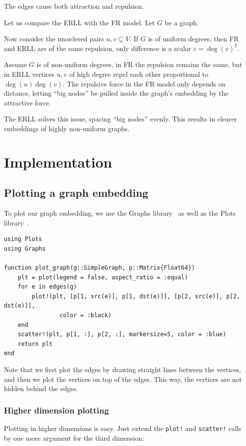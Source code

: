 \documentclass[12pt]{article}
\begin{document}
The edges cause both attraction and repulsion.

Let us compare the ERLL with the FR model. Let $G$ be a graph.

Now consider the unordered pairs ${u,v} \subseteq V$.
If $G$ is of uniform degrees, then FR and ERLL are of the same repulsion, only difference is a scalar $c=\deg{(v)}^2$.

Assume $G$ is of non-uniform degrees, in FR the repulsion remains the same, but in ERLL vertices $u,v$ of high degree repel each other proportional to $\deg(u)\deg(v)$.
The repulsive force in the FR model only depends on distance, letting ``big nodes'' be pulled inside the graph's embedding by the attractive force.

The ERLL solves this issue, spacing ``big nodes'' evenly. This results in clearer embeddings of highly non-uniform graphs. 

\section{Implementation}

\subsection{Plotting a graph embedding}

To plot our graph embedding, we use the Graphs library~\cite{graphsjl} as well as the Plots library~\cite{plotsjl}.

\begin{verbatim}
using Plots
using Graphs

function plot_graph(g::SimpleGraph, p::Matrix{Float64})
    plt = plot(legend = false, aspect_ratio = :equal)
    for e in edges(g)
        plot!(plt, [p[1, src(e)], p[1, dst(e)]], [p[2, src(e)], p[2, dst(e)]],
                color = :black)
    end
    scatter!(plt, p[1, :], p[2, :], markersize=5, color = :blue)
    return plt
end
\end{verbatim}

Note that we first plot the edges by drawing straight lines between the vertices,
and then we plot the vertices on top of the edges. This way, the vertices are not hidden behind the edges.

\subsubsection{Higher dimension plotting}

Plotting in higher dimensions is easy. Just extend the \texttt{plot!} and \texttt{scatter!} calls by one more argument for the third dimension:
\end{document}
